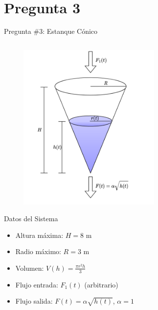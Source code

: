 \documentclass[
    10pt,
    aspectratio=169,
    xcolor={dvipsnames},
    spanish,
    ]{beamer}
\begin{document}
\section{Pregunta 3}
\begin{frame}{Pregunta \#3: Estanque Cónico}
\vspace{-0.35cm}
\begin{columns}
    \begin{column}{0.34\textwidth}
      \vspace{-0.2cm}
      \begin{figure}[ht]
          \centering
          \includegraphics[width=0.63\textwidth]{Figura_4.png} %
      \end{figure}
      \scriptsize
      \begin{block}{Datos del Sistema}
        \setlength\itemsep{0.1em}
        \begin{itemize}
            \item Altura máxima: $H = 8$ m
            \item Radio máximo: $R = 3$ m
            \item Volumen: $V(h) = \frac{\pi r^2 h}{3}$
            \item Flujo entrada: $F_1(t)$ (arbitrario)
            \item Flujo salida: $F(t) = \alpha \sqrt{h(t)}$, $\alpha = 1$
        \end{itemize}
      \end{block}
    \end{column}
    

\end{columns}
\end{frame}
\end{document}
